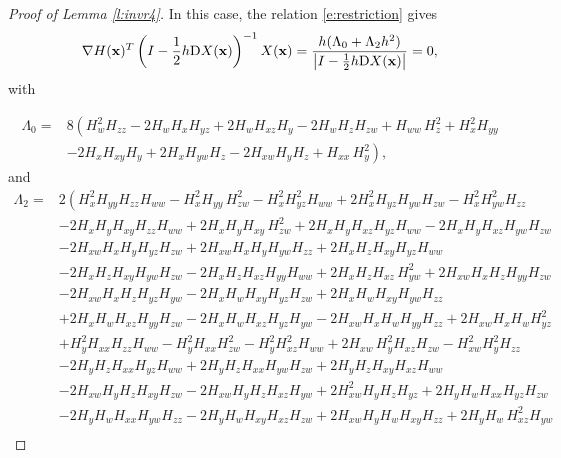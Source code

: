 \documentclass[11pt]{article}
\begin{document}
\begin{proof}[Proof of Lemma \ref{l:invr4}]
In this case, the relation \eqref{e:restriction} gives
\begin{equation}\label{e:h0h2r4}
\nabla H({\bf{x}})^T \left(I-\frac{1}{2}h{\mathrm D}X({\bf{x}})\right)^{-1}X({\bf{x}})=\frac{h(\Lambda_0+\Lambda_2 h^2)}{\left|I-\frac{1}{2}h {\mathrm D}X({\bf{x}})\right|}=0,
\end{equation}
with

\begin{align*}
\Lambda_0=&8 \left(H_{w}^{2} H_{zz} -2 H_{w} H_{x} H_{yz} +2 H_{w} H_{xz} H_{y} -2 H_{w} H_{z} H_{zw} + H_{ww} \,H_{z}^{2}+ H_{x}^{2} H_{yy}\right.\\
&\left. -2 H_{x} H_{xy} H_{y} +2 H_{x} H_{yw} H_{z} -2 H_{xw} H_{y} H_{z} + H_{xx} \,H_{y}^{2}\right),
\end{align*}
and
\begin{align*}
\Lambda_2=&
2\left( H_{x}^{2} H_{yy} H_{zz} H_{ww} - H_{x}^{2} H_{yy} \,H_{zw}^{2}- H_{x}^{2} H_{yz}^{2} H_{ww} +2 H_{x}^{2} H_{yz} H_{yw} H_{zw} - H_{x}^{2} H_{yw}^{2} H_{zz}\right.\\
& -2 H_{x} H_{y} H_{xy} H_{zz} H_{ww} +2 H_{x} H_{y} H_{xy} \,H_{zw}^{2}+2 H_{x} H_{y} H_{xz} H_{yz} H_{ww} -2 H_{x} H_{y} H_{xz} H_{yw} H_{zw}\\
& -2 H_{xw} H_{x} H_{y} H_{yz} H_{zw} +2 H_{xw} H_{x} H_{y} H_{yw} H_{zz} +2 H_{x} H_{z} H_{xy} H_{yz} H_{ww} \\
& -2 H_{x} H_{z} H_{xy} H_{yw} H_{zw}-2 H_{x} H_{z} H_{xz} H_{yy} H_{ww} +2 H_{x} H_{z} H_{xz} \,H_{yw}^{2}+2 H_{xw} H_{x} H_{z} H_{yy} H_{zw} \\
&-2 H_{xw} H_{x} H_{z} H_{yz} H_{yw} -2 H_{x} H_{w} H_{xy} H_{yz} H_{zw} +2 H_{x} H_{w} H_{xy} H_{yw} H_{zz}   \\
&+2 H_{x} H_{w} H_{xz} H_{yy} H_{zw}-2 H_{x} H_{w} H_{xz} H_{yz} H_{yw}-2 H_{xw} H_{x} H_{w} H_{yy} H_{zz} +2 H_{xw} H_{x} H_{w} H_{yz}^{2}\\
&+ H_{y}^{2} H_{xx} H_{zz} H_{ww} - H_{y}^{2} H_{xx} H_{zw}^{2}- H_{y}^{2} H_{xz}^{2} H_{ww} +2 H_{xw} \,H_{y}^{2} H_{xz} H_{zw} - H_{xw}^{2} H_{y}^{2} H_{zz} \\
&-2 H_{y} H_{z} H_{xx} H_{yz} H_{ww} +2 H_{y} H_{z} H_{xx} H_{yw} H_{zw} +2 H_{y} H_{z} H_{xy} H_{xz} H_{ww}  \\
&-2 H_{xw} H_{y} H_{z} H_{xy} H_{zw} -2 H_{xw} H_{y} H_{z} H_{xz} H_{yw}+2 H_{xw}^{2} H_{y} H_{z} H_{yz} +2 H_{y} H_{w} H_{xx} H_{yz} H_{zw}  \\
&-2 H_{y} H_{w} H_{xx} H_{yw} H_{zz}-2 H_{y} H_{w} H_{xy} H_{xz} H_{zw}+2 H_{xw} H_{y} H_{w} H_{xy} H_{zz} +2 H_{y} H_{w} \,H_{xz}^{2} H_{yw} \\

\end{align*}
\end{proof}
\end{document}
